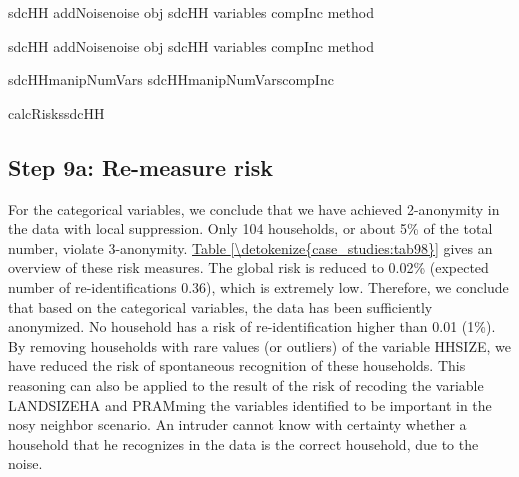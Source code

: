 \documentclass[letterpaper,10pt,english]{sphinxmanual}
\begin{document}
\begin{sphinxVerbatim}[commandchars=\\\{\},numbers=left,firstnumber=1,stepnumber=1]
sdcHH  addNoisenoise   obj  sdcHH variables  compInc method  

sdcHH  addNoisenoise   obj  sdcHH variables  compInc method  

sdcHHmanipNumVars\PYG{p}{[}\PYG{p}{]}  sdcHHmanipNumVars\PYG{p}{[}compInc\PYG{p}{]}

calcRiskssdcHH
\end{sphinxVerbatim}


\subsection{Step 9a: Re-measure risk}
\label{\detokenize{case_studies:step-9a-re-measure-risk}}
For the categorical variables, we conclude that we have achieved
2-anonymity in the data with local suppression. Only 104 households, or
about 5\% of the total number, violate 3-anonymity. \hyperref[\detokenize{case_studies:tab98}]{Table \ref{\detokenize{case_studies:tab98}}} gives an
overview of these risk measures. The global risk is reduced to 0.02\%
(expected number of re-identifications 0.36), which is extremely low.
Therefore, we conclude that based on the categorical variables, the data
has been sufficiently anonymized. No household has a risk of
re-identification higher than 0.01 (1\%). By removing households with
rare values (or outliers) of the variable HHSIZE, we have reduced the
risk of spontaneous recognition of these households. This reasoning can
also be applied to the result of the risk of recoding the variable
LANDSIZEHA and PRAMming the variables identified to be important in the
nosy neighbor scenario. An intruder cannot know with certainty whether a
household that he recognizes in the data is the correct household, due
to the noise.
\end{document}
